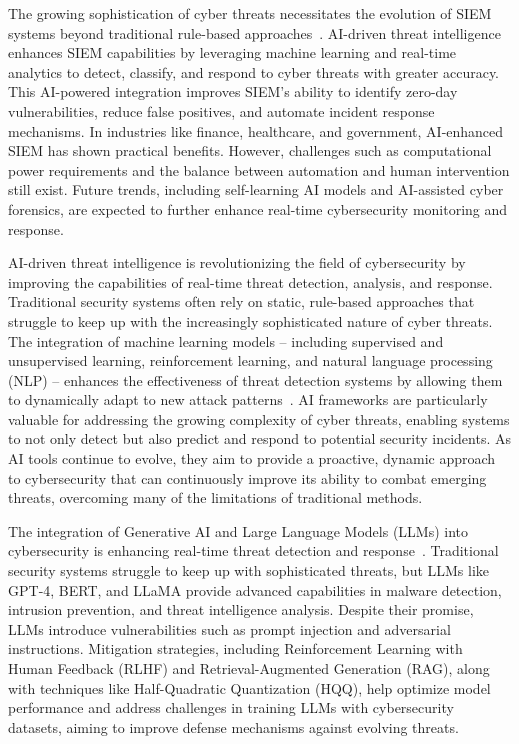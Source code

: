 The growing sophistication of cyber threats necessitates the evolution of SIEM systems beyond traditional rule-based approaches~\cite{gold2025aidriven}. AI-driven threat intelligence enhances SIEM capabilities by leveraging machine learning and real-time analytics to detect, classify, and respond to cyber threats with greater accuracy. This AI-powered integration improves SIEM's ability to identify zero-day vulnerabilities, reduce false positives, and automate incident response mechanisms. In industries like finance, healthcare, and government, AI-enhanced SIEM has shown practical benefits. However, challenges such as computational power requirements and the balance between automation and human intervention still exist. Future trends, including self-learning AI models and AI-assisted cyber forensics, are expected to further enhance real-time cybersecurity monitoring and response.

AI-driven threat intelligence is revolutionizing the field of cybersecurity by improving the capabilities of real-time threat detection, analysis, and response. Traditional security systems often rely on static, rule-based approaches that struggle to keep up with the increasingly sophisticated nature of cyber threats. The integration of machine learning models -- including supervised and unsupervised learning, reinforcement learning, and natural language processing (NLP) -- enhances the effectiveness of threat detection systems by allowing them to dynamically adapt to new attack patterns~\cite{ovabor2024aidriven}. AI frameworks are particularly valuable for addressing the growing complexity of cyber threats, enabling systems to not only detect but also predict and respond to potential security incidents. As AI tools continue to evolve, they aim to provide a proactive, dynamic approach to cybersecurity that can continuously improve its ability to combat emerging threats, overcoming many of the limitations of traditional methods.

The integration of Generative AI and Large Language Models (LLMs) into cybersecurity is enhancing real-time threat detection and response~\cite{ferrag2024genai}. Traditional security systems struggle to keep up with sophisticated threats, but LLMs like GPT-4, BERT, and LLaMA provide advanced capabilities in malware detection, intrusion prevention, and threat intelligence analysis. Despite their promise, LLMs introduce vulnerabilities such as prompt injection and adversarial instructions. Mitigation strategies, including Reinforcement Learning with Human Feedback (RLHF) and Retrieval-Augmented Generation (RAG), along with techniques like Half-Quadratic Quantization (HQQ), help optimize model performance and address challenges in training LLMs with cybersecurity datasets, aiming to improve defense mechanisms against evolving threats.

